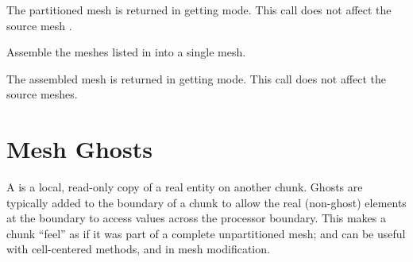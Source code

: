 The partitioned mesh is returned in getting mode.
This call does not affect the source mesh .
  

Assemble the  meshes listed in  into
a single mesh.  

The assembled mesh is returned in getting mode.
This call does not affect the source meshes.







\section{Mesh Ghosts}
\label{sec:ghost}

A  is a local, read-only copy of a real entity
on another chunk. Ghosts are typically added to the boundary of a chunk to allow the real (non-ghost) elements at the boundary to access values across the processor boundary.  This makes a chunk ``feel'' as if it was part of a complete unpartitioned mesh; and can be useful with cell-centered methods, and in mesh modification.

